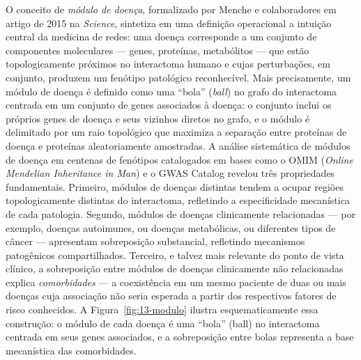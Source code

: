 O conceito de \emph{módulo de doença}, formalizado por Menche e colaboradores em artigo de 2015 na \emph{Science}, sintetiza em uma definição operacional a intuição central da medicina de redes: uma doença corresponde a um conjunto de componentes moleculares --- genes, proteínas, metabólitos --- que estão topologicamente próximos no interactoma humano e cujas perturbações, em conjunto, produzem um fenótipo patológico reconhecível. Mais precisamente, um módulo de doença é definido como uma ``bola'' (\emph{ball}) no grafo do interactoma centrada em um conjunto de genes associados à doença: o conjunto inclui os próprios genes de doença e seus vizinhos diretos no grafo, e o módulo é delimitado por um raio topológico que maximiza a separação entre proteínas de doença e proteínas aleatoriamente amostradas. A análise sistemática de módulos de doença em centenas de fenótipos catalogados em bases como o OMIM (\emph{Online Mendelian Inheritance in Man}) e o GWAS Catalog revelou três propriedades fundamentais. Primeiro, módulos de doenças distintas tendem a ocupar regiões topologicamente distintas do interactoma, refletindo a especificidade mecanística de cada patologia. Segundo, módulos de doenças clinicamente relacionadas --- por exemplo, doenças autoimunes, ou doenças metabólicas, ou diferentes tipos de câncer --- apresentam sobreposição substancial, refletindo mecanismos patogênicos compartilhados. Terceiro, e talvez mais relevante do ponto de vista clínico, a sobreposição entre módulos de doenças clinicamente não relacionadas explica \emph{comorbidades} --- a coexistência em um mesmo paciente de duas ou mais doenças cuja associação não seria esperada a partir dos respectivos fatores de risco conhecidos. A Figura~\ref{fig:13-modulo} ilustra esquematicamente essa construção: o módulo de cada doença é uma ``bola'' (ball) no interactoma centrada em seus genes associados, e a sobreposição entre bolas representa a base mecanística das comorbidades.

